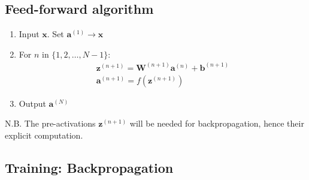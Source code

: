 \documentclass{sgh_article}
\begin{document}
        \subsection{Feed-forward algorithm}
            \begin{enumerate}
                \item Input $\symbf{x}$. Set $\symbf{a}^{(1)} \rightarrow
                    \symbf{x}$
                \item For $n$ in $\{1, 2, \dots, N-1\}$:
                    \begin{gather*}
                        \symbf{z}^{(n+1)} = \symbf{W}^{(n+1)} \symbf{a}^{(n)} +
                        \symbf{b}^{(n+1)} \\ \symbf{a}^{(n+1)} = f \left(
                        \symbf{z}^{(n+1)} \right)
                    \end{gather*}
                \item Output $\symbf{a}^{(N)}$
            \end{enumerate}
            N.B. The pre-activations $\symbf{z}^{(n+1)}$ will be needed for
            backpropagation, hence their explicit computation.

        \subsection{Training: Backpropagation}
\end{document}
